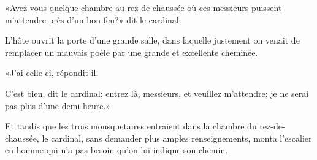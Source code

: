 «Avez-vous quelque chambre au rez-de-chaussée où ces messieurs puissent m'attendre près d'un bon feu?» dit le cardinal. 

L'hôte ouvrit la porte d'une grande salle, dans laquelle justement on venait de remplacer un mauvais poêle par une grande et excellente cheminée. 

«J'ai celle-ci, répondit-il. 

\speak  C'est bien, dit le cardinal; entrez là, messieurs, et veuillez m'attendre; je ne serai pas plus d'une demi-heure.» 

Et tandis que les trois mousquetaires entraient dans la chambre du rez-de-chaussée, le cardinal, sans demander plus amples renseignements, monta l'escalier en homme qui n'a pas besoin qu'on lui indique son chemin.